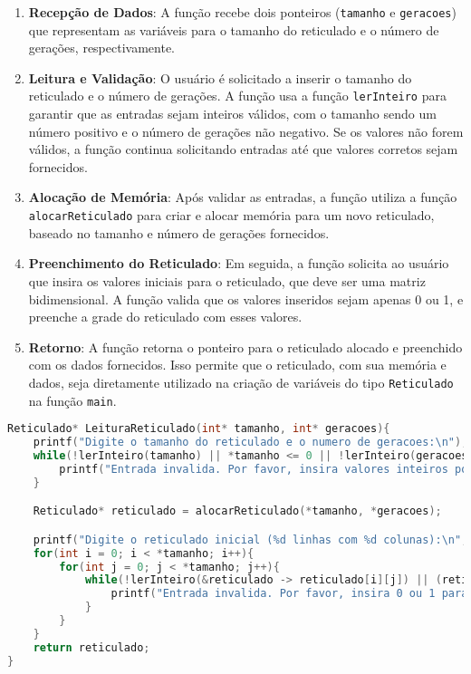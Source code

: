 \documentclass{article}
\begin{document}
\begin{enumerate}
    \item \textbf{Recepção de Dados}: A função recebe dois ponteiros (\verb|tamanho| e \verb|geracoes|) que representam as variáveis para o tamanho do reticulado e o número de gerações, respectivamente.
    \item \textbf{Leitura e Validação}: O usuário é solicitado a inserir o tamanho do reticulado e o número de gerações. A função usa a função \verb|lerInteiro| para garantir que as entradas sejam inteiros válidos, com o tamanho sendo um número positivo e o número de gerações não negativo. Se os valores não forem válidos, a função continua solicitando entradas até que valores corretos sejam fornecidos.
    \item \textbf{Alocação de Memória}: Após validar as entradas, a função utiliza a função \verb|alocarReticulado| para criar e alocar memória para um novo reticulado, baseado no tamanho e número de gerações fornecidos.
    \item \textbf{Preenchimento do Reticulado}: Em seguida, a função solicita ao usuário que insira os valores iniciais para o reticulado, que deve ser uma matriz bidimensional. A função valida que os valores inseridos sejam apenas 0 ou 1, e preenche a grade do reticulado com esses valores.
    \item \textbf{Retorno}: A função retorna o ponteiro para o reticulado alocado e preenchido com os dados fornecidos. Isso permite que o reticulado, com sua memória e dados, seja diretamente utilizado na criação de variáveis do tipo \verb|Reticulado| na função \verb|main|.
\end{enumerate}
 \begin{lstlisting}[caption={},label={lst:cod1},language=C]
Reticulado* LeituraReticulado(int* tamanho, int* geracoes){
    printf("Digite o tamanho do reticulado e o numero de geracoes:\n");
    while(!lerInteiro(tamanho) || *tamanho <= 0 || !lerInteiro(geracoes) || *geracoes < 0){
        printf("Entrada invalida. Por favor, insira valores inteiros positivos para o tamanho do reticulado e nao negativos para o numero de geracoes:\n");
    }

    Reticulado* reticulado = alocarReticulado(*tamanho, *geracoes);

    printf("Digite o reticulado inicial (%d linhas com %d colunas):\n", *tamanho, *tamanho);
    for(int i = 0; i < *tamanho; i++){
        for(int j = 0; j < *tamanho; j++){
            while(!lerInteiro(&reticulado -> reticulado[i][j]) || (reticulado -> reticulado[i][j] != 0 && reticulado -> reticulado[i][j] != 1)){
                printf("Entrada invalida. Por favor, insira 0 ou 1 para a celula (%d, %d):\n", i, j);
            }
        }
    }
    return reticulado;
}
\end{lstlisting}
\end{document}
